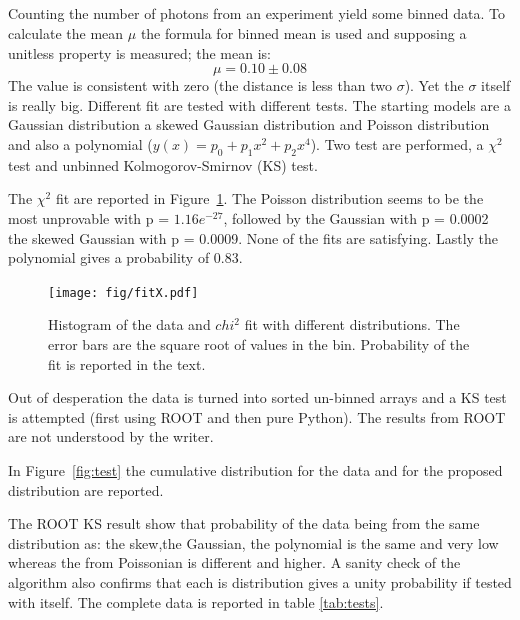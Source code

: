 \documentclass[twocolumn]{article}
\begin{document}
\subsection{}
	Counting the number of photons from an experiment yield some binned data.
	To calculate the mean $\mu$ the formula for binned mean is used and supposing  a unitless property is measured; the mean is:
	\begin{equation}
		 \mu = 0.10 \pm 0.08
	\end{equation}
	The value is consistent with zero (the distance is less than two  $\sigma$). Yet the $\sigma$ itself is really big.
	Different fit are tested with different tests. The starting models are a Gaussian distribution a skewed Gaussian distribution and Poisson distribution and also a polynomial ($y(x) =p_0 + p_1 x^2 + p_2x^4 $).
	Two test are performed, a $\chi ^2 $ test and  unbinned Kolmogorov-Smirnov (KS) test.

	The $\chi ^2 $ fit are reported in Figure~\ref{fig:fitX}. The Poisson distribution seems to be the most unprovable  with p = $1.16e^{-27}$, followed by the Gaussian with p = 0.0002 the skewed Gaussian with p = 0.0009. None of the fits are satisfying.
	Lastly the polynomial gives a probability of 0.83.
	\begin{figure}[h!]
		\begin{center}
			\texttt{[image: fig/fitX.pdf]}
		\end{center}
		\caption{Histogram of the data and $chi ^2 $ fit with different distributions. The error bars are the square root of values in the bin. Probability of the fit is reported in the text.}
		\label{fig:fitX}
	\end{figure}

	Out of desperation the data is turned into sorted un-binned arrays and a KS test is attempted (first using ROOT and then pure Python).
	The results from ROOT are not understood by the writer.

	In Figure~\ref{fig:test} the cumulative distribution for the data and for the proposed distribution are reported.

	The  ROOT KS result show that probability of the data  being from the same distribution as: the skew,the Gaussian, the polynomial is the same and very low whereas the  from Poissonian is different and higher.
	A sanity check of the algorithm also confirms that each is distribution gives a unity probability if tested with itself.
	The complete data is reported in table \ref{tab:tests}.
\end{document}
